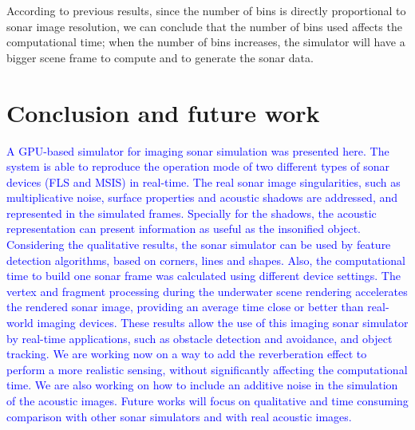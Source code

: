 \documentclass[final,5p,times]{elsarticle}
\begin{document}
According to previous results, since the number of bins is directly
proportional to sonar image resolution, we can conclude that the number of bins used affects the computational time; when the number of bins increases, the simulator will have a bigger scene frame to compute and to generate the sonar data.



\section{Conclusion and future work}
\label{conclusion}

\textcolor{blue}{A GPU-based simulator for imaging sonar simulation was presented here. The system is able to reproduce the operation mode of two different types of sonar devices (FLS and MSIS) in real-time. The real sonar image singularities, such as multiplicative noise, surface properties and acoustic shadows are addressed, and represented in the simulated frames. Specially for the shadows, the acoustic representation can present information as useful as the insonified object. Considering the qualitative results, the sonar simulator can be used by feature detection algorithms, based on corners, lines and shapes. Also, the computational time to build one sonar frame was calculated using different device settings. The vertex and fragment processing during the underwater scene rendering accelerates the rendered sonar image, providing an average time close or better than real-world imaging devices. These results allow the use of this imaging sonar simulator by real-time applications, such as obstacle detection and avoidance, and object tracking. We are working now on a way to add the reverberation effect to perform a more realistic sensing, without significantly affecting the computational time. We are also working on how to include an additive noise in the simulation of the acoustic images. Future works will focus on qualitative and time consuming comparison with other sonar simulators and with real acoustic images.}










\end{document}
